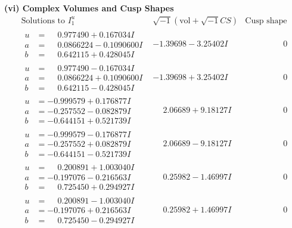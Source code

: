 \documentclass[1p]{elsarticle_modified}
\theoremstyle{definition}
\newcommand{\I}{\sqrt{-1}}
\begin{document}
\newpage\flushleft \textbf{(vi) Complex Volumes and Cusp Shapes}
$$\begin{array}{c|c|c}  
\text{Solutions to }I^u_{1}& \I (\text{vol} + \sqrt{-1}CS) & \text{Cusp shape}\\
 \hline 
\begin{aligned}
u &= \phantom{-}0.977490 + 0.167034 I \\
a &= \phantom{-}0.0866224 - 0.1090600 I \\
b &= \phantom{-}0.642115 + 0.428045 I\end{aligned}
 & -1.39698 - 3.25402 I & \phantom{-0.000000 } 0 \\ \hline\begin{aligned}
u &= \phantom{-}0.977490 - 0.167034 I \\
a &= \phantom{-}0.0866224 + 0.1090600 I \\
b &= \phantom{-}0.642115 - 0.428045 I\end{aligned}
 & -1.39698 + 3.25402 I & \phantom{-0.000000 } 0 \\ \hline\begin{aligned}
u &= -0.999579 + 0.176877 I \\
a &= -0.257552 - 0.082879 I \\
b &= -0.644151 + 0.521739 I\end{aligned}
 & \phantom{-}2.06689 + 9.18127 I & \phantom{-0.000000 } 0 \\ \hline\begin{aligned}
u &= -0.999579 - 0.176877 I \\
a &= -0.257552 + 0.082879 I \\
b &= -0.644151 - 0.521739 I\end{aligned}
 & \phantom{-}2.06689 - 9.18127 I & \phantom{-0.000000 } 0 \\ \hline\begin{aligned}
u &= \phantom{-}0.200891 + 1.003040 I \\
a &= -0.197076 - 0.216563 I \\
b &= \phantom{-}0.725450 + 0.294927 I\end{aligned}
 & \phantom{-}0.25982 - 1.46997 I & \phantom{-0.000000 } 0 \\ \hline\begin{aligned}
u &= \phantom{-}0.200891 - 1.003040 I \\
a &= -0.197076 + 0.216563 I \\
b &= \phantom{-}0.725450 - 0.294927 I\end{aligned}
 & \phantom{-}0.25982 + 1.46997 I & \phantom{-0.000000 } 0 \\ \hline\begin{aligned}

\end{aligned}
\end{array}$$
\end{document}
